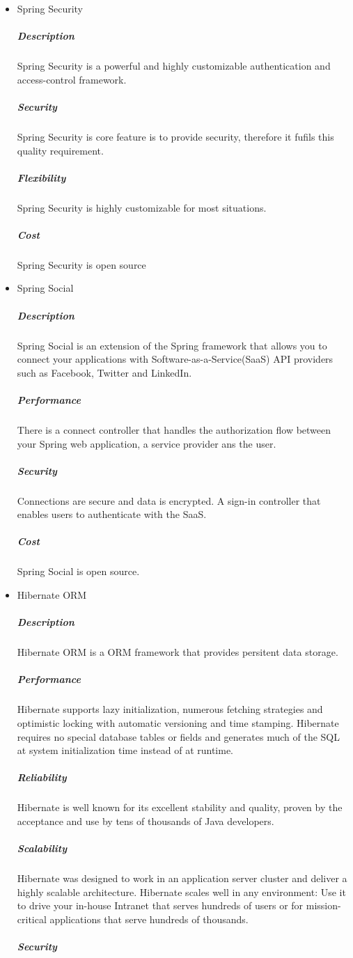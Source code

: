 \documentclass[a4paper,10pt]{article}
\begin{document}
\begin{itemize}
				It makes it easy to use data access technologies, relational and non-relational databases, map-reduce frameworks, and cloud-based data services.
			\subparagraph{Performance}
				Spring Data performance within the system is good. It has a powerful repository and custom object-mapping abstractions.		
			
			\subparagraph{Cost}
				Spring Data is open source
		\item Spring Security
			\subparagraph{Description}
				Spring Security is a powerful and highly customizable authentication and access-control framework. 
			\subparagraph{Security}
				Spring Security is core feature is to provide security, therefore it fufils this quality requirement.
			\subparagraph{Flexibility}
				Spring Security is highly customizable for most situations.
			\subparagraph{Cost}
				Spring Security is open source
		\item Spring Social
			\subparagraph{Description}
				Spring Social is an extension of the Spring framework that allows you to connect your applications with Software-as-a-Service(SaaS) API providers such as Facebook, Twitter and LinkedIn.
			\subparagraph{Performance}
				There is a connect controller that handles the authorization flow between your Spring web application, a service provider ans the user.
			
			\subparagraph{Security}
				Connections are secure and data is encrypted. A sign-in controller that enables users to authenticate with the SaaS.
			
			\subparagraph{Cost}
				Spring Social is open source.
		\item Hibernate ORM
			\subparagraph{Description}
				Hibernate ORM is a ORM framework that provides persitent data storage.
			\subparagraph{Performance}
				Hibernate supports lazy initialization, numerous fetching strategies and optimistic locking with automatic versioning and time stamping. Hibernate requires no special database tables or fields and generates much of the SQL at system initialization time instead of at runtime.
			\subparagraph{Reliability}
				Hibernate is well known for its excellent stability and quality, proven by the acceptance and use by tens of thousands of Java developers.
			\subparagraph{Scalability}
				Hibernate was designed to work in an application server cluster and deliver a highly scalable architecture. Hibernate scales well in any environment: Use it to drive your in-house Intranet that serves hundreds of users or for mission-critical applications that serve hundreds of thousands.
			\subparagraph{Security}
			

\end{itemize}
\end{document}
